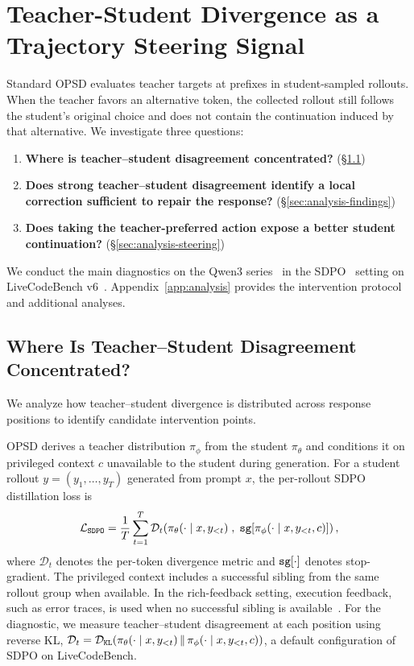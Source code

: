 \section{Teacher-Student Divergence as a Trajectory Steering Signal}
\label{sec:analysis}

Standard OPSD evaluates teacher targets at prefixes in student-sampled rollouts. When the teacher favors an alternative token, the collected rollout still follows the student's original choice and does not contain the continuation induced by that alternative. We investigate three questions:
\begin{enumerate}[leftmargin=2em]
    \item \textbf{Where is teacher--student disagreement concentrated?} (\S\ref{sec:analysis-setup})
    \item \textbf{Does strong teacher--student disagreement identify a local correction sufficient to repair the response?} (\S\ref{sec:analysis-findings})
    \item \textbf{Does taking the teacher-preferred action expose a better student continuation?} (\S\ref{sec:analysis-steering})
\end{enumerate}

We conduct the main diagnostics on the Qwen3 series~\citep{yang2025qwen3} in the SDPO~\citep{hubotter2026sdpo} setting on LiveCodeBench v6~\citep{jain2024livecodebench}. Appendix~\ref{app:analysis} provides the intervention protocol and additional analyses.


\subsection{Where Is Teacher--Student Disagreement Concentrated?}
\label{sec:analysis-setup}


We analyze how teacher--student divergence is distributed across response positions to identify candidate intervention points.

OPSD derives a teacher distribution $\pi_\phi$ from the student $\pi_\theta$ and conditions it on privileged context $c$ unavailable to the student during generation. For a student rollout $y=(y_1,\dots,y_T)$ generated from prompt $x$, the per-rollout SDPO distillation loss is
\begin{equation}
\label{eq:sdpo}
\mathcal{L}_{\tt{SDPO}}
= \frac{1}{T}\sum_{t=1}^{T}
\mathcal D_t \!\left(
\pi_\theta(\cdot \mid x, y_{<t})
\;,\;
{\tt sg}[\pi_\phi(\cdot \mid x, y_{<t}, c)]
\right),
\end{equation}
where $\mathcal D_t $ denotes the per-token divergence metric and ${\tt sg}[\cdot]$ denotes stop-gradient. The privileged context includes a successful sibling from the same rollout group when available. In the rich-feedback setting, execution feedback, such as error traces, is used when no successful sibling is available~\citep{hubotter2026sdpo}.
For the diagnostic, we measure teacher--student disagreement at each position using reverse KL, $\mathcal D_t =\mathcal D_{\tt KL}\!\left(\pi_\theta(\cdot\mid x,y_{<t})\,\|\,\pi_\phi(\cdot\mid x,y_{<t},c)\right)$, a default configuration of SDPO on LiveCodeBench. 

